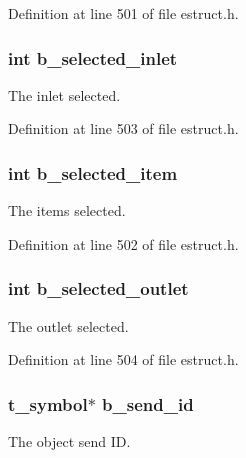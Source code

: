Definition at line 501 of file estruct.\-h.

\hypertarget{struct__edspbox_a0cebb4789c213079e0490e86c10c2893}{
\subsubsection[{b\-\_\-selected\-\_\-inlet}]{\setlength{\rightskip}{0pt plus 5cm}int b\-\_\-selected\-\_\-inlet}}\label{struct__edspbox_a0cebb4789c213079e0490e86c10c2893}
The inlet selected. 

Definition at line 503 of file estruct.\-h.

\hypertarget{struct__edspbox_a1f65b6d093e53fd85bed085ce0c5dd8e}{
\subsubsection[{b\-\_\-selected\-\_\-item}]{\setlength{\rightskip}{0pt plus 5cm}int b\-\_\-selected\-\_\-item}}\label{struct__edspbox_a1f65b6d093e53fd85bed085ce0c5dd8e}
The items selected. 

Definition at line 502 of file estruct.\-h.

\hypertarget{struct__edspbox_acbf0482cb9c6e192e2059775acc1ac86}{
\subsubsection[{b\-\_\-selected\-\_\-outlet}]{\setlength{\rightskip}{0pt plus 5cm}int b\-\_\-selected\-\_\-outlet}}\label{struct__edspbox_acbf0482cb9c6e192e2059775acc1ac86}
The outlet selected. 

Definition at line 504 of file estruct.\-h.

\hypertarget{struct__edspbox_ac59460230e622f821660b599e2f96ca9}{
\subsubsection[{b\-\_\-send\-\_\-id}]{\setlength{\rightskip}{0pt plus 5cm}t\-\_\-symbol$\ast$ b\-\_\-send\-\_\-id}}\label{struct__edspbox_ac59460230e622f821660b599e2f96ca9}
The object send I\-D. 


